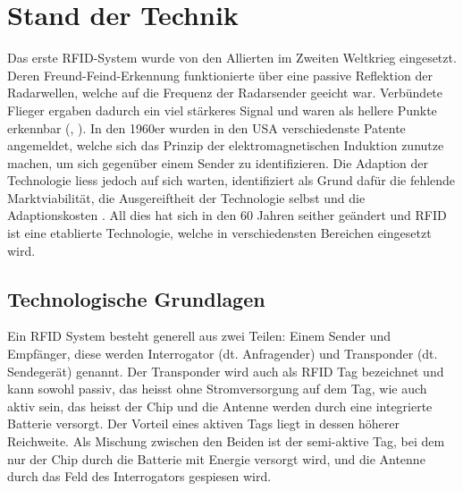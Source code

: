 \chapter{Stand der Technik}
\label{ch:StandDerTechnik}

Das erste \gls{RFID}-System wurde von den Allierten im Zweiten Weltkrieg eingesetzt. Deren Freund-Feind-Erkennung funktionierte über eine passive Reflektion der Radarwellen, welche auf die Frequenz der Radarsender geeicht war. Verbündete Flieger ergaben dadurch ein viel stärkeres Signal und waren als hellere Punkte erkennbar (\cite{chawla2007}, \cite{uswardep1946_3}). In den 1960er wurden in den USA verschiedenste Patente angemeldet, welche sich das Prinzip der elektromagnetischen Induktion zunutze machen, um sich gegenüber einem Sender zu identifizieren. Die Adaption der Technologie liess jedoch auf sich warten, \citeauthor{want2004} identifiziert als Grund dafür die fehlende Marktviabilität, die Ausgereiftheit der Technologie selbst und die Adaptionskosten \parencite{want2004}. All dies hat sich in den 60 Jahren seither geändert und \gls{RFID} ist eine etablierte Technologie, welche in verschiedensten Bereichen eingesetzt wird.

\section{Technologische Grundlagen}

Ein \gls{RFID} System besteht generell aus zwei Teilen: Einem Sender und Empfänger, diese werden Interrogator (dt. Anfragender) und Transponder (dt. Sendegerät) genannt. Der Transponder wird auch als \gls{RFID} Tag bezeichnet und kann sowohl passiv, das heisst ohne Stromversorgung auf dem Tag, wie auch aktiv sein, das heisst der Chip und die Antenne werden durch eine integrierte Batterie versorgt. Der Vorteil eines aktiven Tags liegt in dessen höherer Reichweite. Als Mischung zwischen den Beiden ist der semi-aktive Tag, bei dem nur der Chip durch die Batterie mit Energie versorgt wird, und die Antenne durch das Feld des Interrogators gespiesen wird.

